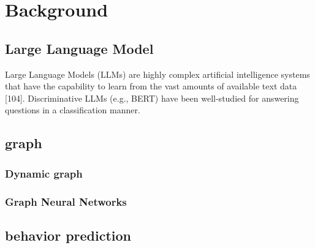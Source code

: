 

\chapter{Background}\label{chapter:background}


\section{Large Language Model}
Large Language Models (LLMs) are highly complex artificial intelligence systems that have the capability to learn from the vast amounts of available text data [104]. Discriminative LLMs (e.g., BERT) have been well-studied for answering questions in a classification manner. 

\section{graph}

\subsection{Dynamic graph}

\subsection{Graph Neural Networks}

\section{behavior prediction}

